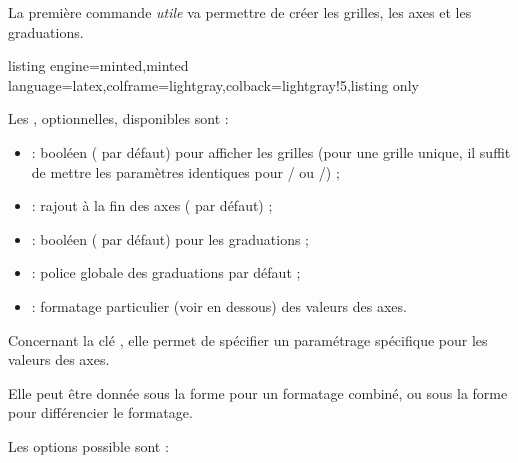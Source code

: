 \documentclass[11pt,a4paper]{ltxdoc}
\begin{document}
La première commande \textit{utile} va permettre de créer les grilles, les axes et les graduations.

\begin{tcblisting}{listing engine=minted,minted language=latex,colframe=lightgray,colback=lightgray!5,listing only}
\end{tcblisting}

Les \MontreCode{[clés]}, optionnelles, disponibles sont :

\smallskip

\begin{itemize}
  \item {} : booléen ( par défaut) pour afficher les grilles (pour une grille unique, il suffit de mettre les paramètres identiques pour / ou /) ;
  \item {} : rajout à la fin des axes ( par défaut) ;
  \item {} : booléen ( par défaut) pour les graduations ;
  \item {} : police globale des graduations { par défaut} ;
  \item {} : formatage particulier (voir en dessous) des valeurs des axes.
\end{itemize}

\smallskip

Concernant la clé , elle permet de spécifier un paramétrage spécifique pour les valeurs des axes.

\smallskip

Elle peut être donnée sous la forme  pour un formatage combiné, ou sous la forme  pour différencier le formatage.

\smallskip

Les options possible sont :

\smallskip
\end{document}
